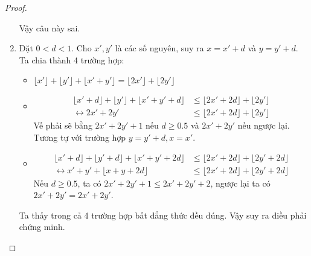 \begin{proof}
\begin{enumerate}[label=\alph*)]
\begin{itemize}
        \end{itemize}
        Vậy câu này sai.
        \item Đặt $0<d<1$. Cho $x',y'$ là các số nguyên, suy ra $x=x'+d$ và $y=y'+d$. Ta chia thành 4 trường hợp: \begin{itemize}
            \item $\lfloor x'\rfloor+\lfloor y'\rfloor+\lfloor x'+y'\rfloor=\lfloor2x'\rfloor+\lfloor2y'\rfloor$
            \item \begin{align*}
                \lfloor x'+d\rfloor+\lfloor y'\rfloor+\lfloor x'+y'+d\rfloor&\leq\lfloor2x'+2d\rfloor+\lfloor2y'\rfloor\\
                \leftrightarrow2x'+2y'&\leq\lfloor2x'+2d\rfloor+\lfloor2y'\rfloor
            \end{align*}
            Vế phải sẽ bằng $2x'+2y'+1$ nếu $d\geq0.5$ và $2x'+2y'$ nếu ngược lại. Tương tự với trường hợp $y=y'+d,x=x'$.
            \item \begin{align*}
                \lfloor x'+d\rfloor+\lfloor y'+d\rfloor+\lfloor x'+y'+2d\rfloor&\leq\lfloor2x'+2d\rfloor+\lfloor2y'+2d\rfloor\\
                \leftrightarrow x'+y'+\lfloor x+y+2d\rfloor&\leq\lfloor2x'+2d\rfloor+\lfloor2y'+2d\rfloor
            \end{align*}
            Nếu $d\geq0.5$, ta có $2x'+2y'+1\leq2x'+2y'+2$, ngược lại ta có $2x'+2y'=2x'+2y'$.
        \end{itemize}
        Ta thấy trong cả 4 trường hợp bất đẳng thức đều đúng. Vậy suy ra điều phải chứng minh.
    \end{enumerate}
\end{proof}

